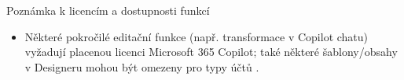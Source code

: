 Poznámka k licencím a dostupnosti funkcí
\begin{itemize}
  \item Některé pokročilé editační funkce (např. transformace v Copilot chatu) vyžadují placenou licenci Microsoft 365 Copilot; také některé šablony/obsahy v Designeru mohou být omezeny pro typy účtů \cite{kb_ai_101_tipu_pdf_04e4a115_page_52_2,kb_ai_101_tipu_pdf_04e4a115_page_51_1}.
\end{itemize}